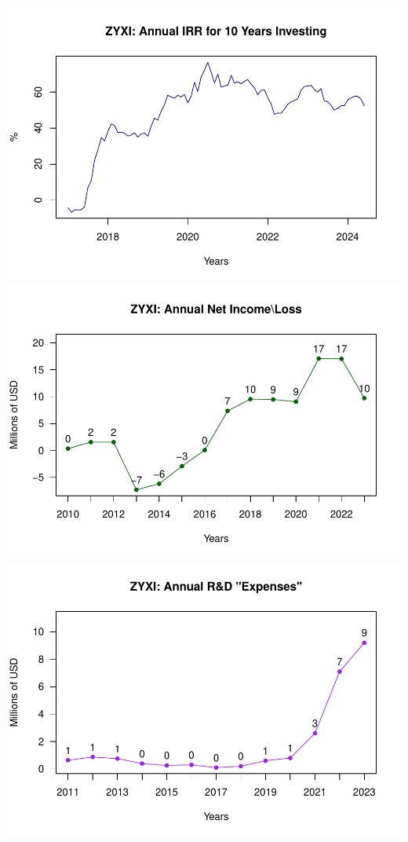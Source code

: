 \documentclass[
]{book}
\begin{document}
\includegraphics{_main_files/figure-latex/unnamed-chunk-1-11.pdf}
\includegraphics{_main_files/figure-latex/unnamed-chunk-1-12.pdf}
\includegraphics{_main_files/figure-latex/unnamed-chunk-1-13.pdf}
\end{document}
